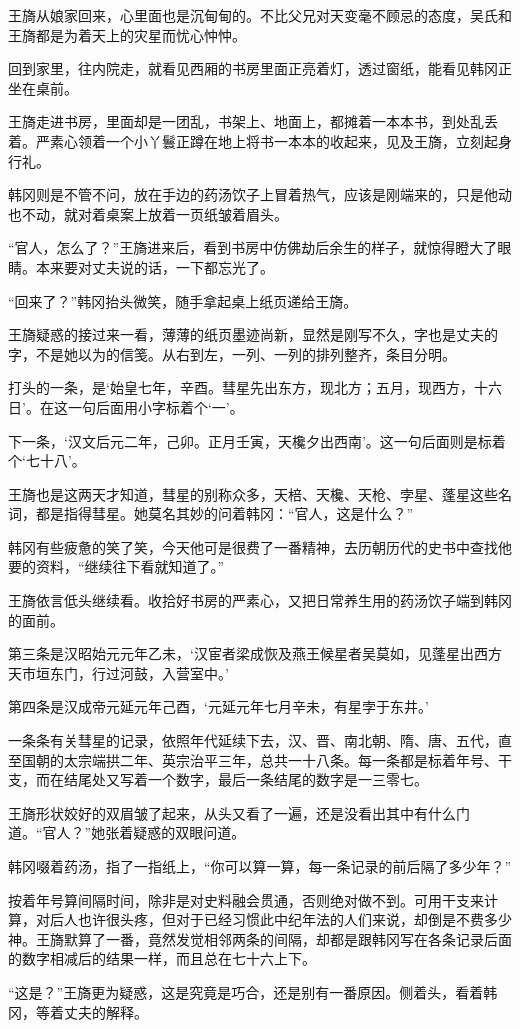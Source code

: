 王旖从娘家回来，心里面也是沉甸甸的。不比父兄对天变毫不顾忌的态度，吴氏和王旖都是为着天上的灾星而忧心忡忡。

回到家里，往内院走，就看见西厢的书房里面正亮着灯，透过窗纸，能看见韩冈正坐在桌前。

王旖走进书房，里面却是一团乱，书架上、地面上，都摊着一本本书，到处乱丢着。严素心领着一个小丫鬟正蹲在地上将书一本本的收起来，见及王旖，立刻起身行礼。

韩冈则是不管不问，放在手边的药汤饮子上冒着热气，应该是刚端来的，只是他动也不动，就对着桌案上放着一页纸皱着眉头。

“官人，怎么了？”王旖进来后，看到书房中仿佛劫后余生的样子，就惊得瞪大了眼睛。本来要对丈夫说的话，一下都忘光了。

“回来了？”韩冈抬头微笑，随手拿起桌上纸页递给王旖。

王旖疑惑的接过来一看，薄薄的纸页墨迹尚新，显然是刚写不久，字也是丈夫的字，不是她以为的信笺。从右到左，一列、一列的排列整齐，条目分明。

打头的一条，是‘始皇七年，辛酉。彗星先出东方，现北方；五月，现西方，十六日’。在这一句后面用小字标着个‘一’。

下一条，‘汉文后元二年，己卯。正月壬寅，天欃夕出西南’。这一句后面则是标着个‘七十八’。

王旖也是这两天才知道，彗星的别称众多，天棓、天欃、天枪、孛星、蓬星这些名词，都是指得彗星。她莫名其妙的问着韩冈：“官人，这是什么？”

韩冈有些疲惫的笑了笑，今天他可是很费了一番精神，去历朝历代的史书中查找他要的资料，“继续往下看就知道了。”

王旖依言低头继续看。收拾好书房的严素心，又把日常养生用的药汤饮子端到韩冈的面前。

第三条是汉昭始元元年乙未，‘汉宦者梁成恢及燕王候星者吴莫如，见蓬星出西方天市垣东门，行过河鼓，入营室中。’

第四条是汉成帝元延元年己酉，‘元延元年七月辛未，有星孛于东井。’

一条条有关彗星的记录，依照年代延续下去，汉、晋、南北朝、隋、唐、五代，直至国朝的太宗端拱二年、英宗治平三年，总共一十八条。每一条都是标着年号、干支，而在结尾处又写着一个数字，最后一条结尾的数字是一三零七。

王旖形状姣好的双眉皱了起来，从头又看了一遍，还是没看出其中有什么门道。“官人？”她张着疑惑的双眼问道。

韩冈啜着药汤，指了一指纸上，“你可以算一算，每一条记录的前后隔了多少年？”

按着年号算间隔时间，除非是对史料融会贯通，否则绝对做不到。可用干支来计算，对后人也许很头疼，但对于已经习惯此中纪年法的人们来说，却倒是不费多少神。王旖默算了一番，竟然发觉相邻两条的间隔，却都是跟韩冈写在各条记录后面的数字相减后的结果一样，而且总在七十六上下。

“这是？”王旖更为疑惑，这是究竟是巧合，还是别有一番原因。侧着头，看着韩冈，等着丈夫的解释。

